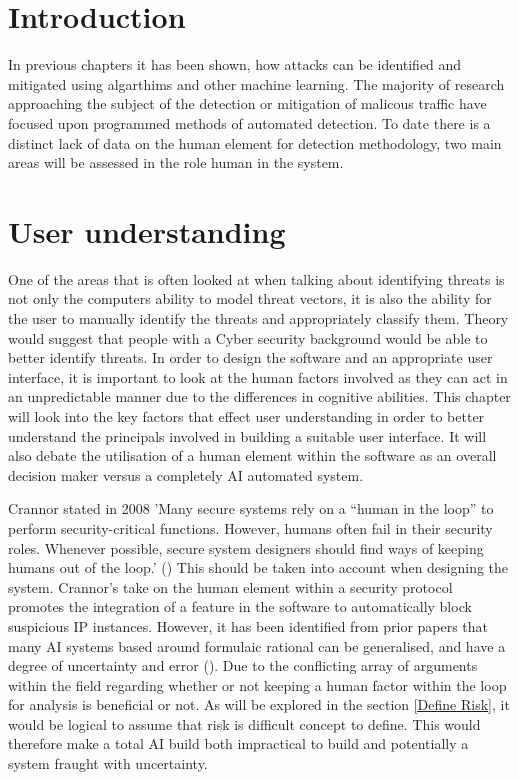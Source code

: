 \section{Introduction}
In previous chapters it has been shown, how attacks can be identified and mitigated using algarthims and other machine learning. The majority of research approaching the subject of the detection or mitigation of malicous traffic have focused upon programmed methods of automated detection. To date there is a distinct lack of data on the human element for detection methodology, two main areas will be assessed in the role human in the system.

\section{User understanding} \label{UI Theory}
One of the areas that is often looked at when talking about identifying threats is not only the computers ability to model threat vectors, it is also the ability for the user to manually identify the threats and appropriately classify them. Theory would suggest that people with a Cyber security background would be able to better identify threats. In order to design the software and an appropriate user interface, it is important to look at the human factors involved as they can act in an unpredictable manner due to the differences in cognitive abilities. This chapter will look into the key factors that effect user understanding in order to better understand the principals involved in building a suitable user interface. It will also debate the utilisation of a human element within the software as an overall decision maker versus a completely AI automated system. 


Crannor stated in 2008 'Many secure systems rely on a “human in the loop” to perform security-critical functions. However, humans often fail in their security roles. Whenever possible, secure system designers should find ways of keeping humans out of the loop.' (\cite{cranor2008framework}) This should be taken into account when designing the system. Crannor's take on the human element within a security protocol promotes the integration of a feature in the software to automatically block suspicious IP instances. However, it has been identified from prior papers that many AI systems based around formulaic rational can be generalised, and have a degree of uncertainty and error (\cite{kim2008slow}). Due to the conflicting array of arguments within the field regarding whether or not keeping a human factor within the loop for analysis is beneficial or not. As will be explored in the section \ref{Define Risk}, it would be logical to assume that risk is difficult concept to define. This would therefore make a total AI build both impractical to build and potentially a system fraught with uncertainty.


